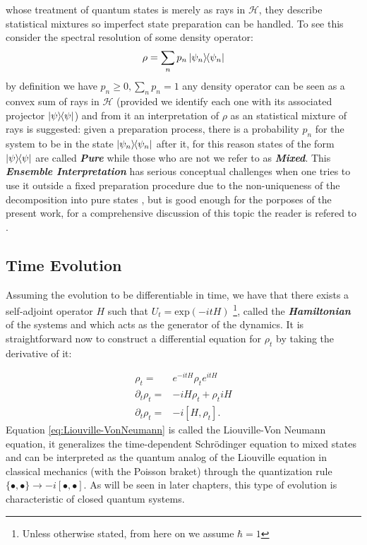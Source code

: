 whose treatment of quantum states is merely as rays in $\mathcal{H}$, they describe statistical mixtures so imperfect state preparation
can be handled. To see this consider the spectral resolution of some density operator:
\begin{equation}
  \rho = \sum_{n}p_{n}\ketbra{\psi_{n}}
\end{equation}
by definition we have $p_{n}\geq 0, \sum_{n}p_{n}=1$  any density operator can be seen as a convex sum of rays in $\mathcal{H}$ (provided we
identify each one with its associated projector $\ketbra{\psi}$) and from it an  interpretation of $\rho$ as an statistical mixture of rays is
suggested: given a preparation process, there is a probability $p_{n}$ for the system to be in the state $\ketbra{\psi_{n}}$ after it, for this
reason states of the form $\ketbra{\psi}$ are called \textbf{\textit{Pure}} while those who are not we refer to as \textbf{\textit{Mixed}}.
This \textbf{\textit{Ensemble Interpretation}} has serious conceptual challenges when one tries to use it outside a
fixed preparation procedure due to the non-uniqueness of the decomposition into pure states \cite{nielsen_quantum_2010},
but is good enough for the porposes of the present work, for a comprehensive discussion of this
topic the reader is refered to \cite{schlosshauer_decoherence_2007}.
\subsection{Time Evolution}
Assuming the evolution to be differentiable in time, we have that there exists a self-adjoint operator $H$ such that $U_{t} = \mathrm{exp}(-itH)$
\footnote{Unless otherwise stated, from here on we assume $\hbar=1$}, called the \textbf{\textit{Hamiltonian}} of the systems and which
acts as the generator of the dynamics. It is straightforward now to construct a differential equation for $\rho_{t}$ by taking the derivative
of it:

\begin{align}
  \rho_{t}=& e^{-itH}\rho_{t}  e^{itH}\\
  \partial_{t}\rho_{t} =& -iH\rho_{t} + \rho_{t}iH\\
  \partial_{t}\rho_{t} =& -i[H, \rho_{t}]\label{eq:Liouville-VonNeumann}.
\end{align}
Equation \eqref{eq:Liouville-VonNeumann} is called the Liouville-Von Neumann equation, it generalizes the time-dependent Schr\"{o}dinger equation
to mixed states and can be interpreted as the quantum analog of the Liouville equation in classical mechanics (with the Poisson braket) through
the quantization rule $\{\bullet,\bullet\} \to -i[\bullet,\bullet]$. As will be seen in later chapters, this type of evolution is characteristic
of closed quantum systems.
